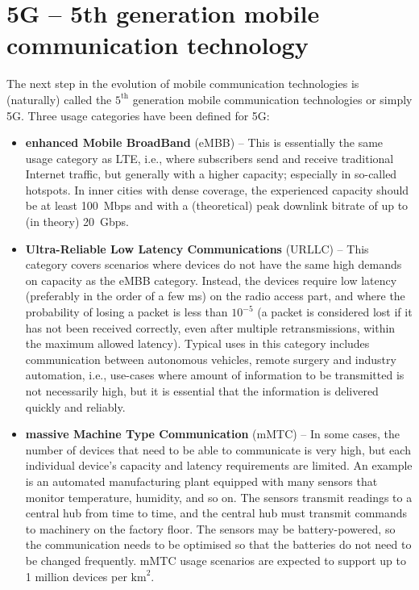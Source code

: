 \section{5G -- 5th generation mobile communication technology}
The next step in the evolution of mobile communication technologies is (naturally) called the $5^{\textrm{th}}$ generation mobile communication technologies or simply 5G. Three usage categories have been defined for 5G:
\begin{itemize}
%
\item \textbf{enhanced Mobile BroadBand} (eMBB) -- This is essentially the same usage category as LTE, i.e., where subscribers send and receive traditional Internet traffic, but generally with a higher capacity; especially in so-called hotspots. In inner cities with dense coverage, the experienced capacity should be at least 100~Mbps and with a (theoretical) peak downlink bitrate of up to (in theory) 20~Gbps.
%
\item \textbf{Ultra-Reliable Low Latency Communications} (URLLC) -- This category covers scenarios where devices do not have the same high demands on capacity as the eMBB category. Instead, the devices require low latency (preferably in the order of a few ms) on the radio access part, and where the probability of losing a packet is less than $10^{-5}$ (a packet is considered lost if it has not been received correctly, even after multiple retransmissions, within the maximum allowed latency). Typical uses in this category includes communication between autonomous vehicles, remote surgery and industry automation, i.e., use-cases where amount of information to be transmitted is not necessarily high, but it is essential that the information is delivered quickly and reliably.
%
\item \textbf{massive Machine Type Communication} (mMTC) -- In some cases, the number of devices that need to be able to communicate is very high, but each individual device's capacity and latency requirements are limited. An example is an automated manufacturing plant equipped with many sensors that monitor temperature, humidity, and so on. The sensors transmit readings to a central hub from time to time, and the central hub must transmit commands to machinery on the factory floor. The sensors may be battery-powered, so the communication needs to be optimised so that the batteries do not need to be changed frequently. mMTC usage scenarios are expected to support up to 1 million devices per $\textrm{km}^2$.
%
\end{itemize}

